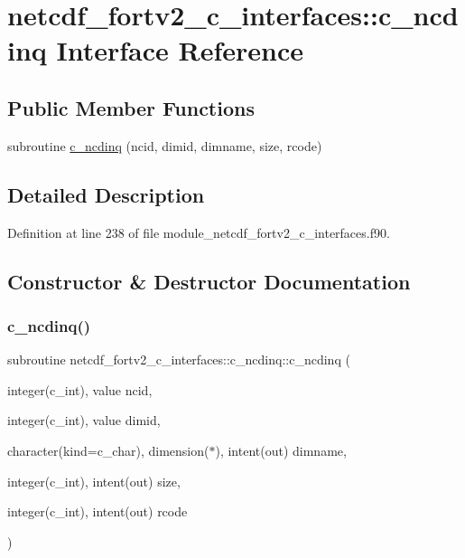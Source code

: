 \hypertarget{interfacenetcdf__fortv2__c__interfaces_1_1c__ncdinq}{}\section{netcdf\+\_\+fortv2\+\_\+c\+\_\+interfaces\+:\+:c\+\_\+ncdinq Interface Reference}
\label{interfacenetcdf__fortv2__c__interfaces_1_1c__ncdinq}
\subsection*{Public Member Functions}
\begin{DoxyCompactItemize}
\item 
subroutine \hyperlink{interfacenetcdf__fortv2__c__interfaces_1_1c__ncdinq_a60f21ee7dffa2fd04215854f18853767}{c\+\_\+ncdinq} (ncid, dimid, dimname, size, rcode)
\end{DoxyCompactItemize}


\subsection{Detailed Description}


Definition at line 238 of file module\+\_\+netcdf\+\_\+fortv2\+\_\+c\+\_\+interfaces.\+f90.



\subsection{Constructor \& Destructor Documentation}
\mbox{\label{interfacenetcdf__fortv2__c__interfaces_1_1c__ncdinq_a60f21ee7dffa2fd04215854f18853767}} 
\subsubsection{\texorpdfstring{c\+\_\+ncdinq()}{c\_ncdinq()}}
{\footnotesize\ttfamily subroutine netcdf\+\_\+fortv2\+\_\+c\+\_\+interfaces\+::c\+\_\+ncdinq\+::c\+\_\+ncdinq (\begin{DoxyParamCaption}\item[{integer(c\+\_\+int), value}]{ncid,  }\item[{integer(c\+\_\+int), value}]{dimid,  }\item[{character(kind=c\+\_\+char), dimension($\ast$), intent(out)}]{dimname,  }\item[{integer(c\+\_\+int), intent(out)}]{size,  }\item[{integer(c\+\_\+int), intent(out)}]{rcode }\end{DoxyParamCaption})}



